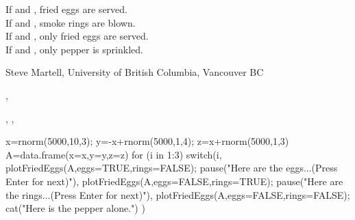 \documentclass[letterpaper]{book}
\begin{document}
\begin{Note}\relax
If  and , fried eggs are served.\\
If  and , smoke rings are blown.\\
If  and , only fried eggs are served.\\
If  and , only pepper is sprinkled.
\end{Note}
\begin{Author}\relax
Steve Martell, University of British Columbia, Vancouver BC
\end{Author}
\begin{SeeAlso}\relax
{}, 

, , 
\end{SeeAlso}
\begin{Examples}
\begin{ExampleCode}
x=rnorm(5000,10,3); y=-x+rnorm(5000,1,4); z=x+rnorm(5000,1,3)
A=data.frame(x=x,y=y,z=z)
for (i in 1:3)
   switch(i,
   {plotFriedEggs(A,eggs=TRUE,rings=FALSE);
   pause("Here are the eggs...(Press Enter for next)")},
   {plotFriedEggs(A,eggs=FALSE,rings=TRUE);
   pause("Here are the rings...(Press Enter for next)")},
   {plotFriedEggs(A,eggs=FALSE,rings=FALSE);
   cat("Here is the pepper alone.\n")} )
\end{ExampleCode}
\end{Examples}
\end{document}
